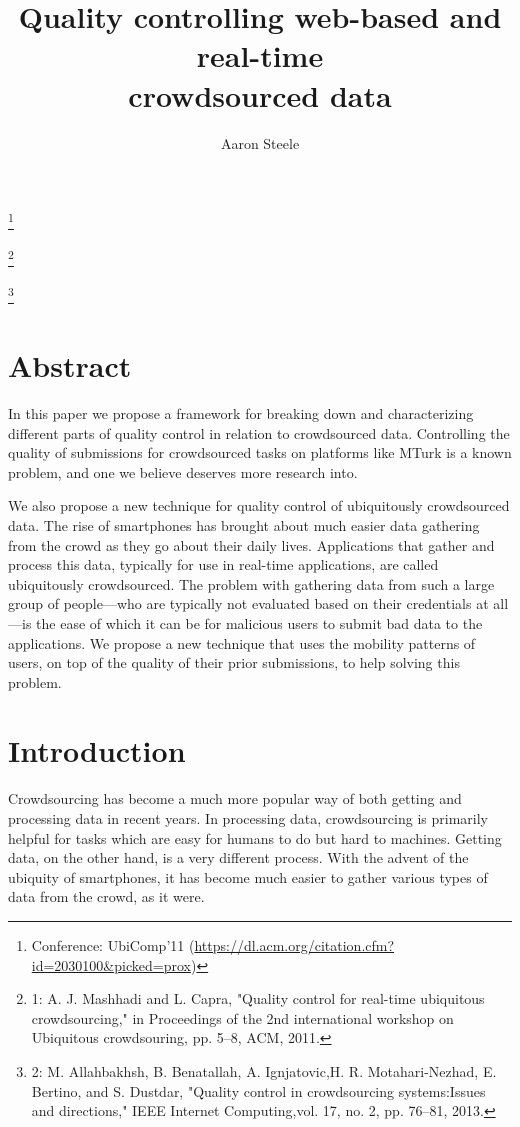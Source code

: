 \documentclass[9pt,twocolumn]{article}
\title{Quality controlling web-based and real-time\\crowdsourced data}
\author{Aaron Steele}
\date{}
\newcommand\blfootnote[1]{%
	\begingroup
	\renewcommand\thefootnote{}\footnote{#1}%
	\addtocounter{footnote}{-1}%
	\endgroup
}
\begin{document}
	\maketitle
	
	\blfootnote{Conference: UbiComp'11 (\url{https://dl.acm.org/citation.cfm?id=2030100&picked=prox}) }
	\blfootnote{1: A. J. Mashhadi and L. Capra, "Quality control for real-time ubiquitous crowdsourcing," in Proceedings of the 2nd international workshop on Ubiquitous crowdsouring, pp. 5–8, ACM, 2011.}
	\blfootnote{2: M. Allahbakhsh, B. Benatallah, A. Ignjatovic,H. R. Motahari-Nezhad, E. Bertino, and S. Dustdar, "Quality control in crowdsourcing systems:Issues and directions," IEEE Internet Computing,vol. 17, no. 2, pp. 76–81, 2013.}
	
	\section*{Abstract}


	In this paper we propose a framework for breaking down and characterizing different parts of quality control in relation to crowdsourced data. Controlling the quality of submissions for crowdsourced tasks on platforms like MTurk is a known problem, and one we believe deserves more research into.
	
	We also propose a new technique for quality control of ubiquitously crowdsourced data. The rise of smartphones has brought about much easier data gathering from the crowd as they go about their daily lives. Applications that gather and process this data, typically for use in real-time applications, are called ubiquitously crowdsourced. The problem with gathering data from such a large group of people---who are typically not evaluated based on their credentials at all---is the ease of which it can be for malicious users to submit bad data to the applications. We propose a new technique that uses the mobility patterns of users, on top of the quality of their prior submissions, to help solving this problem.
	
	
	\section*{Introduction}
	
	Crowdsourcing has become a much more popular way of both getting and processing data in recent years. In processing data, crowdsourcing is primarily helpful for tasks which are easy for humans to do but hard to machines. \cite{burke2006participatory}
	Getting data, on the other hand, is a very different process. With the advent of the ubiquity of smartphones, it has become much easier to gather various types of data from the crowd, as it were.
	
\end{document}
